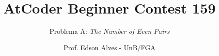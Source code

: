 \title{AtCoder Beginner Contest 159}
\subtitle{Problema A: {\it The Number of Even Pairs}}
\author{Prof. Edson Alves - UnB/FGA}
\date{}
